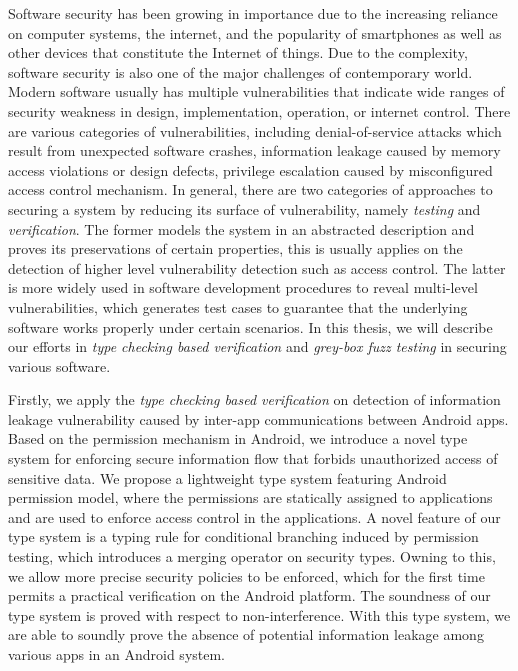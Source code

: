 
Software security has been growing in importance due to the increasing reliance on computer systems, the internet, and the popularity of smartphones as well as other devices that constitute the Internet of things. Due to the complexity, software security is also one of the major challenges of contemporary world. Modern software usually has multiple vulnerabilities that indicate wide ranges of security weakness in design, implementation, operation, or internet control. There are various categories of vulnerabilities, including denial-of-service attacks which result from unexpected software crashes, information leakage caused by memory access violations or design defects, privilege escalation caused by misconfigured access control mechanism. In general, there are two categories of approaches to securing a system by reducing its surface of vulnerability, namely \emph{testing} and \emph{verification}. The former models the system in an abstracted description and proves its preservations of certain properties, this is usually applies on the detection of higher level vulnerability detection such as access control. The latter is more widely used in software development procedures to reveal multi-level vulnerabilities, which generates test cases to guarantee that the underlying software works properly under certain scenarios. In this thesis, we will describe our efforts in \emph{type checking based verification} and \emph{grey-box fuzz testing} in securing various software.

Firstly, we apply the \emph{type checking based verification} on detection of information leakage vulnerability caused by inter-app communications between Android apps. Based on the permission mechanism in Android, we introduce a novel type system for enforcing secure information flow that forbids unauthorized access of sensitive data. We propose a lightweight type system featuring Android permission model, where the permissions are statically assigned to applications and are used to enforce access control in the applications. A novel feature of our type system is a typing rule for conditional branching induced by permission testing, which introduces a merging operator on security types. Owning to this, we allow more precise security policies to be enforced, which for the first time permits a practical verification on the Android platform. The soundness of our type system is proved with respect to non-interference.
With this type system, we are able to soundly prove the absence of potential information leakage among various apps in an Android system.

